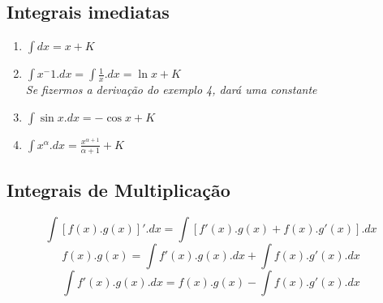 \documentclass{article}
\begin{document}
		\subsection{Integrais imediatas}
			\begin{enumerate}
				\item $\int dx = x+K$
				\item $\int x^-1.dx = \int \frac{1}{x}.dx = \ln x+K$ \\ \textit{Se fizermos a derivação do exemplo 4, dará uma constante}
				\item $\int \sin x . dx = -\cos x +K$
				\item $\int x^\alpha .dx = \frac{x^{\alpha+1}}{\alpha+1}+K$
			\end{enumerate}
		\subsection{Integrais de Multiplicação}
			$$\int [f(x).g(x)]'.dx = \int[f'(x).g(x)+f(x).g'(x)].dx$$
			$$f(x).g(x) = \int f'(x).g(x).dx + \int f(x).g'(x).dx$$
			$$\int f'(x).g(x).dx = f(x).g(x) - \int f(x).g'(x).dx$$
\end{document}
